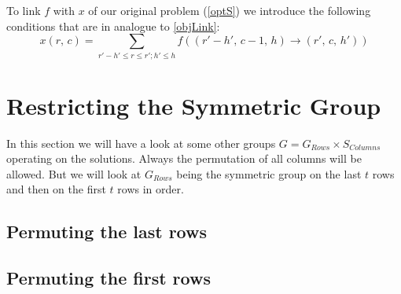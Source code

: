 \documentclass{amsart}
\theoremstyle{definition}
\begin{document}
To link \(f\) with \(x\) of our original problem (\ref{optS}) we
introduce the following conditions that are in analogue to \ref{objLink}:
\begin{equation}
  x \left( r,\, c \right) =
  \sum_{r' - h' \leq r \leq r'; h' \leq h} f\left(\left(r'-h',\, c-1,\, h\right)
    \rightarrow \left(r',\, c,\, h'\right) \right)
\end{equation}

\section{Restricting the Symmetric Group}
In this section we will have a look at some other groups \(G =
G_{Rows} \times S_{Columns}\) operating on the solutions.  Always the
permutation of all columns will be allowed.  But we will look at
\(G_{Rows}\) being the symmetric group on the last \(t\) rows and then
on the first \(t\) rows in order.

\subsection{Permuting the last rows}


\subsection{Permuting the first rows}





\end{document}
